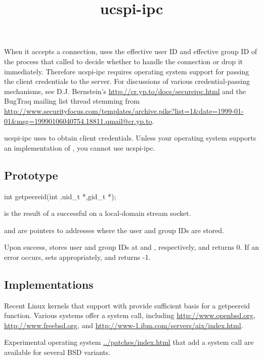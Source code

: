 \documentclass{book}
\title{ucspi-ipc}
\begin{document}
\section{}

When it accepts a connection,  uses the effective user
ID and effective group ID of the process that called  to
decide whether to handle the connection or drop it immediately.
Therefore ucspi-ipc requires operating system support for passing the
client credentials to the server.  For discussions of various
credential-passing mechanisms, see D.J. Bernstein's
\href{Secure interprocess communication}{http://cr.yp.to/docs/secureipc.html}
and the BugTraq mailing list thread stemming from
\href{Wiping out setuid programs}{http://www.securityfocus.com/templates/archive.pike?list=1&date=1999-01-01&msg=19990106040754.18811.qmail@cr.yp.to}.

ucspi-ipc uses  to obtain client credentials.  Unless
your operating system supports an implementation of ,
you cannot use ucspi-ipc.

\subsection{Prototype}
\begin{code}%
  int getpeereid(int ,uid_t *,gid_t *);
\end{code}

 is the result of a successful  on a local-domain
stream socket.

 and  are pointers to addresses where the user and group
IDs are stored.

Upon success,  stores user and group IDs at 
and , respectively, and returns 0.  If an error occurs,
 sets  appropriately, and returns -1.


\subsection{Implementations}
Recent Linux kernels that support  with
 provide sufficient basis for a getpeereid function.
Various systems offer a  system call, including
\href{OpenBSD~3.0}{http://www.openbsd.org},
\href{FreeBSD~4.6}{http://www.freebsd.org}, and
\href{AIX~5L}{http://www-1.ibm.com/servers/aix/index.html}.

Experimental operating system \href{patches}{../patches/index.html}
that add a  system call are available for several BSD
variants.
\end{document}
